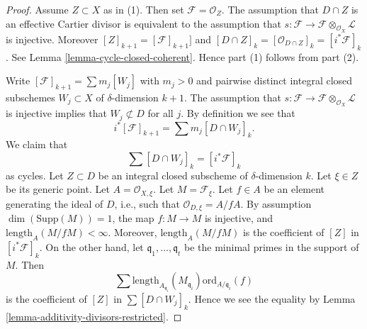\documentclass[10pt,a4paper]{amsart}
\theoremstyle{plain}
\theoremstyle{definition}
\theoremstyle{remark}
\numberwithin{equation}{subsection}
\begin{document}
\begin{proof}
Assume $Z \subset X$ as in (1). Then set $\mathcal{F} = \mathcal{O}_Z$.
The assumption that $D \cap Z$ is an effective Cartier divisor is
equivalent to the assumption that
$s : \mathcal{F} \to \mathcal{F} \otimes_{\mathcal{O}_X} \mathcal{L}$
is injective. Moreover $[Z]_{k + 1} = [\mathcal{F}]_{k + 1}]$
and $[D \cap Z]_k = [\mathcal{O}_{D \cap Z}]_k = [i^*\mathcal{F}]_k$.
See Lemma \ref{lemma-cycle-closed-coherent}.
Hence part (1) follows from part (2).

\medskip\noindent
Write $[\mathcal{F}]_{k + 1} = \sum m_j[W_j]$ with $m_j > 0$
and pairwise distinct integral closed subschemes $W_j \subset X$
of $\delta$-dimension $k + 1$. The assumption that
$s : \mathcal{F} \to \mathcal{F} \otimes_{\mathcal{O}_X} \mathcal{L}$
is injective implies that $W_j \not \subset D$ for all $j$.
By definition we see that
$$
i^*[\mathcal{F}]_{k + 1} = \sum m_j [D \cap W_j]_k.
$$
We claim that
$$
\sum [D \cap W_j]_k = [i^*\mathcal{F}]_k
$$
as cycles.
Let $Z \subset D$ be an integral closed subscheme of $\delta$-dimension
$k$. Let $\xi \in Z$ be its generic point. Let $A = \mathcal{O}_{X, \xi}$.
Let $M = \mathcal{F}_\xi$. Let $f \in A$ be an element generating the
ideal of $D$, i.e., such that $\mathcal{O}_{D, \xi} = A/fA$.
By assumption $\dim(\text{Supp}(M)) = 1$,
the map $f : M \to M$ is injective, and
$\text{length}_A(M/fM) < \infty$. Moreover, $\text{length}_A(M/fM)$
is the coefficient of $[Z]$ in $[i^*\mathcal{F}]_k$. On the
other hand, let $\mathfrak q_1, \ldots, \mathfrak q_t$ be the minimal
primes in the support of $M$. Then
$$
\sum
\text{length}_{A_{\mathfrak q_i}}(M_{\mathfrak q_i})
\text{ord}_{A/\mathfrak q_i}(f)
$$
is the coefficient of $[Z]$ in $\sum [D \cap W_j]_k$.
Hence we see the equality by
Lemma \ref{lemma-additivity-divisors-restricted}.
\end{proof}
\end{document}
